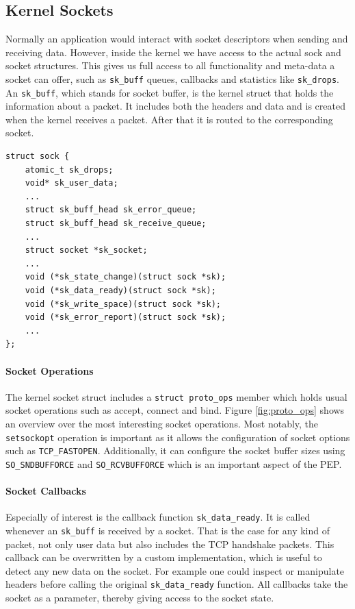 \documentclass[a4paper,english, 12pt]{report}
\begin{document}
\subsection{Kernel Sockets}
Normally an application would interact with socket descriptors when sending and receiving data. However, inside the kernel we have access to the actual sock and socket structures. This gives us full access to all functionality and meta-data a socket can offer, such as \verb|sk_buff| queues, callbacks and statistics like \verb|sk_drops|. An \verb|sk_buff|, which stands for socket buffer, is the kernel struct that holds the information about a packet. It includes both the headers and data and is created when the kernel receives a packet. After that it is routed to the corresponding socket.\\

\noindent\begin{minipage}{\linewidth}
\begin{verbatim}
struct sock {
    atomic_t sk_drops;
    void* sk_user_data;
    ...
    struct sk_buff_head	sk_error_queue;
    struct sk_buff_head	sk_receive_queue;
    ...
    struct socket *sk_socket;
    ...
    void (*sk_state_change)(struct sock *sk);
    void (*sk_data_ready)(struct sock *sk);
    void (*sk_write_space)(struct sock *sk);
    void (*sk_error_report)(struct sock *sk);
    ...
};
\end{verbatim}
\label{fig:kern_sock}
\end{minipage}

\paragraph{Socket Operations}
The kernel socket struct includes a \verb|struct proto_ops| member which holds usual socket operations such as accept, connect and bind.
Figure \ref{fig:proto_ops} shows an overview over the most interesting socket operations. Most notably, the \verb|setsockopt| operation is important as it allows the configuration of socket options such as \verb|TCP_FASTOPEN|. Additionally, it can configure the socket buffer sizes using \verb|SO_SNDBUFFORCE| and \verb|SO_RCVBUFFORCE| which is an important aspect of the PEP.

\paragraph{Socket Callbacks}
Especially of interest is the callback function \verb|sk_data_ready|. It is called whenever an \verb|sk_buff| is received by a socket. That is the case for any kind of packet, not only user data but also includes the TCP handshake packets. This callback can be overwritten by a custom implementation, which is useful to detect any new data on the socket. For example one could inspect or manipulate headers before calling the original \verb|sk_data_ready| function. All callbacks take the socket as a parameter, thereby giving access to the socket state. \\
\end{document}
